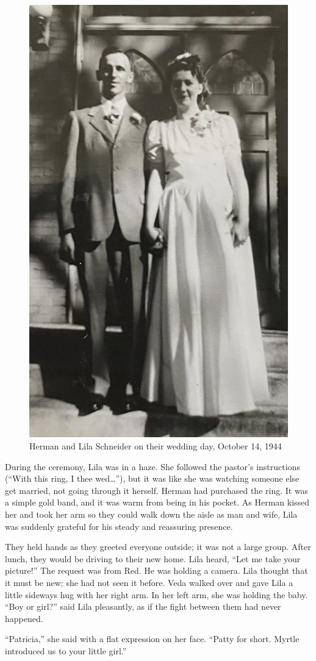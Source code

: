 \documentclass[
  letterpaper,
]{book}
\begin{document}
\begin{figure}[H]

{\centering \includegraphics[width=0.5\linewidth,height=\textheight,keepaspectratio]{images/Akou21edit.jpg}

}

\caption{Herman and Lila Schneider on their wedding day, October 14,
1944}

\end{figure}%

During the ceremony, Lila was in a haze. She followed the pastor's
instructions (``With this ring, I thee wed\ldots{}''), but it was like
she was watching someone else get married, not going through it herself.
Herman had purchased the ring. It was a simple gold band, and it was
warm from being in his pocket. As Herman kissed her and took her arm so
they could walk down the aisle as man and wife, Lila was suddenly
grateful for his steady and reassuring presence.

They held hands as they greeted everyone outside; it was not a large
group. After lunch, they would be driving to their new home. Lila heard,
``Let me take your picture!'' The request was from Red. He was holding a
camera. Lila thought that it must be new; she had not seen it before.
Veda walked over and gave Lila a little sideways hug with her right arm.
In her left arm, she was holding the baby. ``Boy or girl?'' said Lila
pleasantly, as if the fight between them had never happened.

``Patricia,'' she said with a flat expression on her face. ``Patty for
short. Myrtle introduced us to your little girl.''
\end{document}
